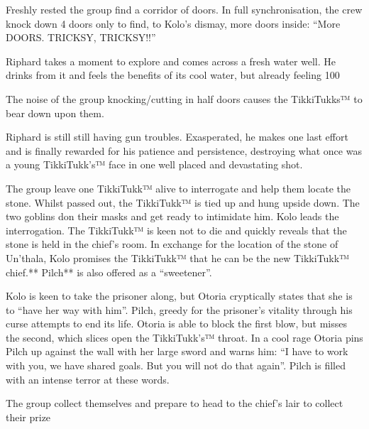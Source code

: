 \documentclass[letterpaper,10pt,twoside,twocolumn,openany]{book}
\begin{document}
Freshly rested the group find a corridor of doors. In full synchronisation, the crew knock down 4 doors only to find, to Kolo’s dismay, more doors inside: “More DOORS. TRICKSY, TRICKSY!!”

Riphard takes a moment to explore and comes across a fresh water well. He drinks from it and feels the benefits of its cool water, but already feeling 100%

The noise of the group knocking/cutting in half doors causes the TikkiTukks™ to bear down upon them.

Riphard is still still having gun troubles. Exasperated, he makes one last effort and is finally rewarded for his patience and persistence, destroying what once was a young TikkiTukk's™ face in one well placed and devastating shot.

The group leave one TikkiTukk™ alive to interrogate and help them locate the stone. Whilst passed out, the TikkiTukk™ is tied up and hung upside down. The two goblins don their masks and get ready to intimidate him. Kolo leads the interrogation. The TikkiTukk™ is keen not to die and quickly reveals that the stone is held in the chief’s room. In exchange for the location of the stone of Un'thala, Kolo promises the TikkiTukk™ that he can be the new TikkiTukk™ chief.** Pilch** is also offered as a “sweetener”.

Kolo is keen to take the prisoner along, but Otoria cryptically states that she is to “have her way with him”. Pilch, greedy for the prisoner’s vitality through his curse attempts to end its life. Otoria is able to block the first blow, but misses the second, which slices open the TikkiTukk’s™ throat. In a cool rage Otoria pins Pilch up against the wall with her large sword and warns him: “I have to work with you, we have shared goals. But you will not do that again”. Pilch is filled with an intense terror at these words.

The group collect themselves and prepare to head to the chief’s lair to collect their prize
\end{document}
